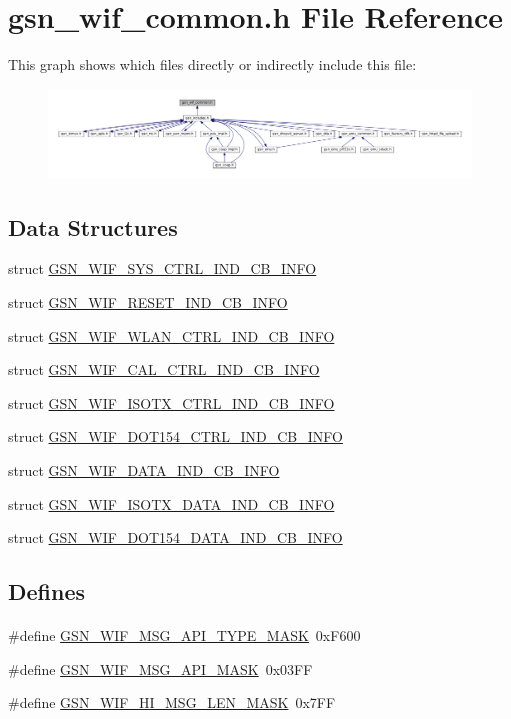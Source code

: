 \hypertarget{a00608}{
\section{gsn\_\-wif\_\-common.h File Reference}
\label{a00608}
}
This graph shows which files directly or indirectly include this file:
\nopagebreak
\begin{figure}[H]
\begin{center}
\leavevmode
\includegraphics[width=400pt]{a00855}
\end{center}
\end{figure}
\subsection*{Data Structures}
\begin{DoxyCompactItemize}
\item 
struct \hyperlink{a00349}{GSN\_\-WIF\_\-SYS\_\-CTRL\_\-IND\_\-CB\_\-INFO}
\item 
struct \hyperlink{a00344}{GSN\_\-WIF\_\-RESET\_\-IND\_\-CB\_\-INFO}
\item 
struct \hyperlink{a00378}{GSN\_\-WIF\_\-WLAN\_\-CTRL\_\-IND\_\-CB\_\-INFO}
\item 
struct \hyperlink{a00318}{GSN\_\-WIF\_\-CAL\_\-CTRL\_\-IND\_\-CB\_\-INFO}
\item 
struct \hyperlink{a00339}{GSN\_\-WIF\_\-ISOTX\_\-CTRL\_\-IND\_\-CB\_\-INFO}
\item 
struct \hyperlink{a00335}{GSN\_\-WIF\_\-DOT154\_\-CTRL\_\-IND\_\-CB\_\-INFO}
\item 
struct \hyperlink{a00324}{GSN\_\-WIF\_\-DATA\_\-IND\_\-CB\_\-INFO}
\item 
struct \hyperlink{a00340}{GSN\_\-WIF\_\-ISOTX\_\-DATA\_\-IND\_\-CB\_\-INFO}
\item 
struct \hyperlink{a00336}{GSN\_\-WIF\_\-DOT154\_\-DATA\_\-IND\_\-CB\_\-INFO}
\end{DoxyCompactItemize}
\subsection*{Defines}
\paragraph*{}
\begin{DoxyCompactItemize}
\item 
\#define \hyperlink{a00608_ac20a0c502121937beaabf53f00fd3776}{GSN\_\-WIF\_\-MSG\_\-API\_\-TYPE\_\-MASK}~0xF600
\item 
\#define \hyperlink{a00608_a179bc8e8f4f110e10eb55e693f7ae535}{GSN\_\-WIF\_\-MSG\_\-API\_\-MASK}~0x03FF
\item 
\#define \hyperlink{a00608_aa680ccc189b1777c2b7e7ae2aecf4137}{GSN\_\-WIF\_\-HI\_\-MSG\_\-LEN\_\-MASK}~0x7FF
\end{DoxyCompactItemize}

